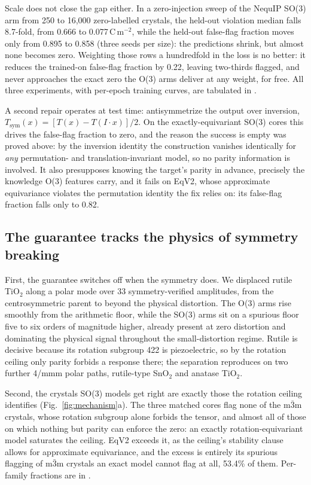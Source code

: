 Scale does not close the gap either. In a zero-injection sweep of the NequIP SO(3) arm from 250 to 16,000 zero-labelled crystals, the held-out violation median falls 8.7-fold, from 0.666 to 0.077\,C\,m$^{-2}$, while the held-out false-flag fraction moves only from 0.895 to 0.858 (three seeds per size): the predictions shrink, but almost none becomes zero. Weighting those rows a hundredfold in the loss is no better: it reduces the trained-on false-flag fraction by 0.22, leaving two-thirds flagged, and never approaches the exact zero the O(3) arms deliver at any weight, for free. All three experiments, with per-epoch training curves, are tabulated in .

A second repair operates at test time: antisymmetrize the output over inversion, $T_{\mathrm{sym}}(x) = [T(x) - T(I\!\cdot\!x)]/2$. On the exactly-equivariant SO(3) cores this drives the false-flag fraction to zero, and the reason the success is empty was proved above: by the inversion identity the construction vanishes identically for \emph{any} permutation- and translation-invariant model, so no parity information is involved. It also presupposes knowing the target's parity in advance, precisely the knowledge O(3) features carry, and it fails on EqV2, whose approximate equivariance violates the permutation identity the fix relies on: its false-flag fraction falls only to 0.82.

\subsection*{The guarantee tracks the physics of symmetry breaking}

First, the guarantee switches off when the symmetry does. We displaced rutile TiO$_2$ along a polar mode over 33 symmetry-verified amplitudes, from the centrosymmetric parent to beyond the physical distortion. The O(3) arms rise smoothly from the arithmetic floor, while the SO(3) arms sit on a spurious floor five to six orders of magnitude higher, already present at zero distortion and dominating the physical signal throughout the small-distortion regime. Rutile is decisive because its rotation subgroup 422 is piezoelectric, so by the rotation ceiling only parity forbids a response there; the separation reproduces on two further 4/mmm polar paths, rutile-type SnO$_2$ and anatase TiO$_2$.

Second, the crystals SO(3) models get right are exactly those the rotation ceiling identifies (Fig.~\ref{fig:mechanism}a). The three matched cores flag none of the m$\bar 3$m crystals, whose rotation subgroup alone forbids the tensor, and almost all of those on which nothing but parity can enforce the zero: an exactly rotation-equivariant model saturates the ceiling. EqV2 exceeds it, as the ceiling's stability clause allows for approximate equivariance, and the excess is entirely its spurious flagging of m$\bar 3$m crystals an exact model cannot flag at all, 53.4\% of them. Per-family fractions are in .

